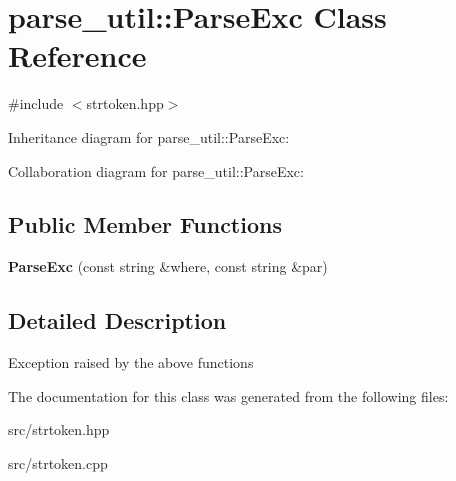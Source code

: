\hypertarget{classparse__util_1_1ParseExc}{}\section{parse\+\_\+util\+:\+:Parse\+Exc Class Reference}
\label{classparse__util_1_1ParseExc}


{\ttfamily \#include $<$strtoken.\+hpp$>$}



Inheritance diagram for parse\+\_\+util\+:\+:Parse\+Exc\+:


Collaboration diagram for parse\+\_\+util\+:\+:Parse\+Exc\+:
\subsection*{Public Member Functions}
\begin{DoxyCompactItemize}
\item 
{\bfseries Parse\+Exc} (const string \&where, const string \&par)\hypertarget{classparse__util_1_1ParseExc_ae9a33563ff6162e3ed9303c8c069ef02}{}\label{classparse__util_1_1ParseExc_ae9a33563ff6162e3ed9303c8c069ef02}

\end{DoxyCompactItemize}


\subsection{Detailed Description}
Exception raised by the above functions 

The documentation for this class was generated from the following files\+:\begin{DoxyCompactItemize}
\item 
src/strtoken.\+hpp\item 
src/strtoken.\+cpp\end{DoxyCompactItemize}
